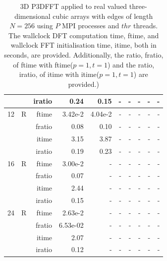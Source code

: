 \documentclass[a4paper]{article}
\begin{document}
\begin{table}[htbp]
\begin{center}
\begin{small}
\begin{tabular}{|r|r|r|r|r|r|r|r|r|r|}
             &             &  iratio &    0.24 &    0.15 &      - &      - &      - &      - &      - \\\hline
   12 &   R &   ftime &    3.42e-2 &    4.04e-2 &      - &      - &      - &      - &      - \\
             &             &  fratio &    0.08 &   0.10 &      - &      - &      - &      - &      - \\
             &             &  itime &    3.15  &    3.87  &      - &      - &      - &      - &      - \\
             &             &  iratio &   0.19 &    0.23 &      - &      - &      - &      - &      - \\\hline
   16 &   R &   ftime &    3.00e-2 &      - &      - &      - &      - &      - &      - \\
             &             &  fratio &    0.07 &     - &      - &      - &      - &      - &      - \\
             &             &  itime &    2.44  &      - &      - &      - &      - &      - &      - \\
             &             &  iratio &    0.15 &      - &      - &      - &      - &      - &      - \\\hline
   24 &   R &   ftime &    2.63e-2 &      - &      - &      - &      - &      - &      - \\
             &             &  fratio &    6.53e-02 &     - &      - &      - &      - &      - &      - \\
             &             &  itime &    2.07  &      - &      - &      - &      - &      - &      - \\
             &             &  iratio &    0.12 &      - &      - &      - &      - &      - &      - \\\hline


\end{tabular}
\caption{3D P3DFFT applied to real valued three-dimensional cubic arrays with edges of length $N=256$ using $P$ MPI processes and $thr$ threads. The wallclock DFT computation time, ftime, and wallclock FFT initialisation time, itime, both in seconds, are provided. Additionally, the ratio, fratio, of ftime  with ftime($p=1,t=1$) and the ratio, iratio, of itime  with itime($p=1,t=1$) are provided.) }\label{Tbl:P3DFFT3d256}
\end{small}
\end{center}
\end{table}
\end{document}
